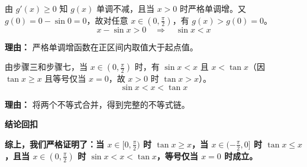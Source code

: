 \begin{proofbox}
\begin{description}[style=nextline, leftmargin=2.8em, labelsep=0.5em, itemsep=0.55em]
    \item[\textbf{步骤七（单调严格增）：}] 由 $g'(x) \geq 0$ 知 $g(x)$ 单调不减，且当 $x>0$ 时严格单调增。又 $g(0) = 0 - \sin 0 = 0$，故对任意 $x \in (0, \frac{\pi}{2})$，有 $g(x) > g(0) = 0$。
    \[
    x - \sin x > 0 \quad \Rightarrow \quad \sin x < x
    \]
    \par\textbf{理由：}
    严格单调增函数在正区间内取值大于起点值。

    \item[\textbf{步骤八（结合得链）：}] 由步骤三和步骤七，当 $x \in (0, \frac{\pi}{2})$ 时，有 $\sin x < x$ 且 $x < \tan x$（因 $\tan x \geq x$ 且等号仅当 $x=0$，故 $x>0$ 时 $\tan x > x$）。
    \[
    \sin x < x < \tan x
    \]
    \par\textbf{理由：}
    将两个不等式合并，得到完整的不等式链。
\end{description}

\medskip
\textbf{\textcolor{CProof}{结论回扣}}

\textbf{综上，我们严格证明了：当 $x \in [0, \frac{\pi}{2})$ 时 $\tan x \geq x$，当 $x \in (-\frac{\pi}{2}, 0]$ 时 $\tan x \leq x$，且当 $x \in (0, \frac{\pi}{2})$ 时 $\sin x < x < \tan x$，等号仅当 $x=0$ 时成立。}
\end{proofbox}
